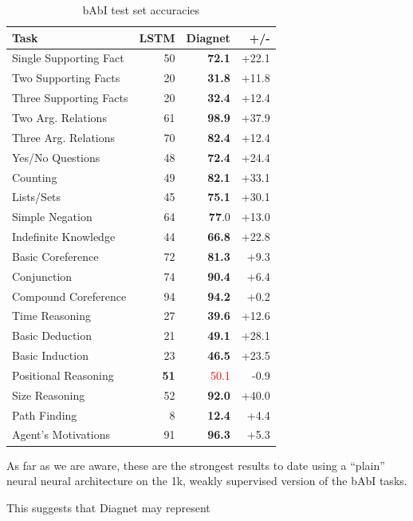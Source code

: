 \documentclass{article}
\begin{document}
\begin{table}

\centering
\caption{bAbI test set accuracies}
\begin{tabular}{|l|r|r|r|}
\hline
Task & LSTM & Diagnet & +/- \\
\hline
Single Supporting Fact & 50 & \textbf{72.1} & +22.1 \\
Two Supporting Facts & 20 & \textbf{31.8} & +11.8 \\
Three Supporting Facts & 20 & \textbf{32.4} & +12.4 \\
Two Arg. Relations & 61 & \textbf{98.9} & +37.9 \\
Three Arg. Relations & 70 & \textbf{82.4} & +12.4 \\
Yes/No Questions & 48 & \textbf{72.4} & +24.4 \\
Counting & 49 & \textbf{82.1} & +33.1 \\
Lists/Sets & 45 & \textbf{75.1} & +30.1 \\
Simple Negation & 64 & \textbf{77}.0 & +13.0 \\
Indefinite Knowledge & 44 & \textbf{66.8} & +22.8 \\
Basic Coreference & 72 & \textbf{81.3} & +9.3 \\
Conjunction & 74 & \textbf{90.4} & +6.4 \\
Compound Coreference & 94 & \textbf{94.2} & +0.2 \\
Time Reasoning & 27 & \textbf{39.6} & +12.6 \\
Basic Deduction & 21 & \textbf{49.1} & +28.1 \\
Basic Induction & 23 & \textbf{46.5} & +23.5 \\
Positional Reasoning & \textbf{51} & \textcolor{red}{50.1} & -0.9 \\
Size Reasoning & 52 & \textbf{92.0} & +40.0 \\
Path Finding & 8 & \textbf{12.4} & +4.4 \\
Agent's Motivations & 91 & \textbf{96.3} & +5.3 \\
\hline

\end{tabular}

\end{table}

As far as we are aware, these are the strongest results to date using a “plain” neural neural architecture on the 1k, weakly supervised version of the bAbI tasks.

This suggests that Diagnet may represent 
\end{document}
